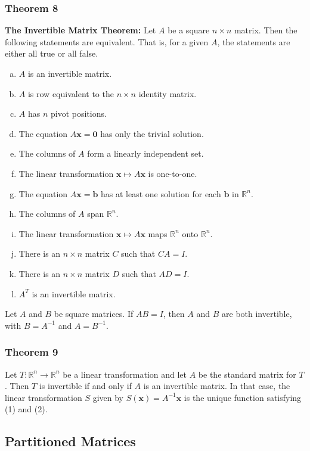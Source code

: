 \documentclass[letterpaper,11pt]{article}
\begin{document}
			\subsubsection{Theorem 8}
				\textbf{The Invertible Matrix Theorem:} Let $A$ be a square $n\times n$ matrix. Then the following statements are equivalent. That is, for a given $A$, the statements are either all true or all false.
				\begin{enumerate}[a.]
					\item $A$ is an invertible matrix.
					\item $A$ is row equivalent to the $n\times n$ identity matrix.
					\item $A$ has $n$ pivot positions.
					\item The equation $A\mathbf{x}=\mathbf{0}$ has only the trivial solution.
					\item The columns of $A$ form a linearly independent set.
					\item The linear transformation $\mathbf{x}\mapsto A\mathbf{x}$ is one-to-one.
					\item The equation $A\mathbf{x}=\mathbf{b}$ has at least one solution for each $\mathbf{b}$ in $\mathbb{R}^n$.
					\item The columns of $A$ span $\mathbb{R}^n$.
					\item The linear transformation $\mathbf{x}\mapsto A\mathbf{x}$ maps $\mathbb{R}^n$ onto $\mathbb{R}^n$.
					\item There is an $n\times n$ matrix $C$ such that $CA=I$.
					\item There is an $n\times n$ matrix $D$ such that $AD=I$.
					\item $A^T$ is an invertible matrix.
				\end{enumerate}
				
			Let $A$ and $B$ be square matrices. If $AB=I$, then $A$ and $B$ are both invertible, with $B=A^{-1}$ and $A=B^{-1}$.
			
			\subsubsection{Theorem 9}
				Let $T:\mathbb{R}^n\rightarrow\mathbb{R}^n$ be a linear transformation and let $A$ be the standard matrix for $T$. Then $T$ is invertible if and only if $A$ is an invertible matrix. In that case, the linear transformation $S$ given by $S(\mathbf{x})=A^{-1}\mathbf{x}$ is the unique function satisfying (1) and (2).
		\subsection{Partitioned Matrices}
\end{document}

